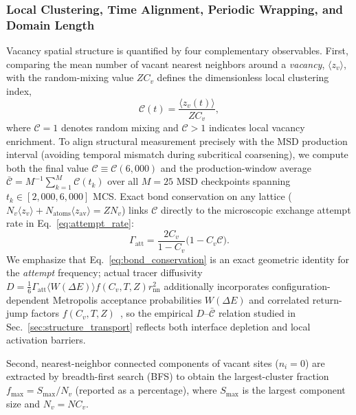 \documentclass[aps,pre,reprint,superscriptaddress,amsmath,amssymb,floatfix]{revtex4-2}
\begin{document}
\subsubsection{Local Clustering, Time Alignment, Periodic Wrapping, and Domain Length}

Vacancy spatial structure is quantified by four complementary observables. First, comparing the mean number of vacant nearest neighbors around a \emph{vacancy}, $\langle z_v \rangle$, with the random-mixing value $Z C_v$ defines the dimensionless local clustering index,
\begin{equation}
  \mathcal{C}(t) = \frac{\langle z_v(t) \rangle}{Z C_v},
  \label{eq:c_index}
\end{equation}
where $\mathcal{C} = 1$ denotes random mixing and $\mathcal{C} > 1$ indicates local vacancy enrichment. To align structural measurement precisely with the MSD production interval (avoiding temporal mismatch during subcritical coarsening), we compute both the final value $\mathcal{C} \equiv \mathcal{C}(6{,}000)$ and the production-window average $\bar{\mathcal{C}} = M^{-1}\sum_{k=1}^M \mathcal{C}(t_k)$ over all $M = 25$ MSD checkpoints spanning $t_k \in [2{,}000, 6{,}000]$ MCS. Exact bond conservation on any lattice ($N_v \langle z_v \rangle + N_{\mathrm{atoms}}\langle z_{\mathrm{av}}\rangle = Z N_v$) links $\mathcal{C}$ directly to the microscopic exchange attempt rate in Eq.~\eqref{eq:attempt_rate}:
\begin{equation}
  \Gamma_{\mathrm{att}} = \frac{2 C_v}{1 - C_v}\bigl(1 - C_v \mathcal{C}\bigr).
  \label{eq:bond_conservation}
\end{equation}
We emphasize that Eq.~\eqref{eq:bond_conservation} is an exact geometric identity for the \emph{attempt} frequency; actual tracer diffusivity $D = \frac{1}{6}\Gamma_{\mathrm{att}}\langle W(\Delta E)\rangle f(C_v, T, Z) r_{\mathrm{nn}}^2$ additionally incorporates configuration-dependent Metropolis acceptance probabilities $W(\Delta E)$ and correlated return-jump factors $f(C_v, T, Z)$~\cite{Kehr1984,Kehr1989}, so the empirical $D$--$\bar{\mathcal{C}}$ relation studied in Sec.~\ref{sec:structure_transport} reflects both interface depletion and local activation barriers.

Second, nearest-neighbor connected components of vacant sites ($n_i = 0$) are extracted by breadth-first search (BFS) to obtain the largest-cluster fraction $f_{\max} = S_{\max}/N_v$ (reported as a percentage), where $S_{\max}$ is the largest component size and $N_v = N C_v$.
\end{document}
